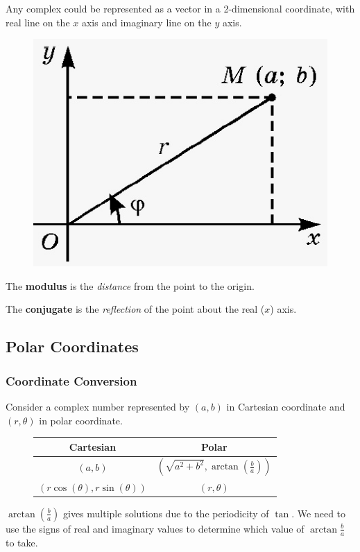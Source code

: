 \documentclass[10pt]{article}
\begin{document}
	\par Any complex could be represented as a vector in a 2-dimensional coordinate, with real line on the $x$ axis and imaginary line on the $y$ axis.
	\begin{figure}[h]
		\centering
		\includegraphics[width=0.4\linewidth]{figures/49_polar_representation_of_complex_number}
	\end{figure}
	\begin{remark}
		The \textbf{modulus} is the \emph{distance} from the point to the origin.
	\end{remark}
	\begin{remark}
		The \textbf{conjugate} is the \emph{reflection} of the point about the real ($x$) axis.
	\end{remark}
	
	
	\subsection{Polar Coordinates}
	\subsubsection{Coordinate Conversion}
		\par Consider a complex number represented by $(a,b)$ in Cartesian coordinate and $(r, \theta)$ in polar coordinate.
		\begin{figure}[h]
			\centering
			\begin{tabular}{|c|c|}
				\hline
				Cartesian & Polar \\
				\hline
				$(a, b)$ & $(\sqrt{a^2 + b^2}, \arctan(\frac{b}{a}))$ \\
				\hline
				$(r \cos(\theta), r \sin(\theta))$ & $(r, \theta)$ \\
				\hline
			\end{tabular}
		\end{figure}
		\begin{remark}
			$\arctan(\frac{b}{a})$ gives multiple solutions due to the periodicity of $\tan$. We need to use the signs of real and imaginary values to determine which value of $\arctan{\frac{b}{a}}$ to take.
		\end{remark}
		
\end{document}
